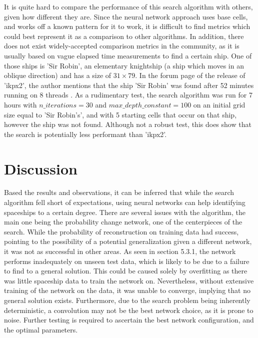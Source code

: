 \documentclass{l4proj}
\begin{document}
It is quite hard to compare the performance of this search algorithm with others, given how different they are. Since the neural network approach uses base cells, and works off a known pattern for it to work, it is difficult to find metrics which could best represent it as a comparison to other algorithms. In addition, there does not exist widely-accepted comparison metrics in the community, as it is usually based on vague elapsed time measurements to find a certain ship. One of those ships is 'Sir Robin', an elementary knightship (a ship which moves in an oblique direction) and has a size of $31 \times 79$. In the forum page of the release of 'ikpx2', the author mentions that the ship 'Sir Robin' was found after 52 minutes running on 8 threads \citep{ikpx}. As a rudimentary test, the search algorithm was run for 7 hours with $n\_iterations = 30$ and $max\_depth\_constant = 100$ on an initial grid size equal to 'Sir Robin's', and with 5 starting cells that occur on that ship, however the ship was not found. Although not a robust test, this does show that the search is potentially less performant than 'ikpx2'.

\section{Discussion}

Based the results and observations, it can be inferred that while the search algorithm fell short of expectations, using neural networks can help identifying spaceships to a certain degree. There are several issues with the algorithm, the main one being the probability change network, one of the centerpieces of the search. While the probability of reconstruction on training data had success, pointing to the possibility of a potential generalization given a different network, it was not as successful in other areas. As seen in section 5.3.1, the network performs inadequately on unseen test data, which is likely to be due to a failure to find to a general solution. This could be caused solely by overfitting as there was little spaceship data to train the network on. Nevertheless, without extensive training of the network on the data, it was unable to converge, implying that no general solution exists. Furthermore, due to the search problem being inherently deterministic, a convolution may not be the best network choice, as it is prone to noise. Further testing is required to ascertain the best network configuration, and the optimal parameters.
\end{document}
